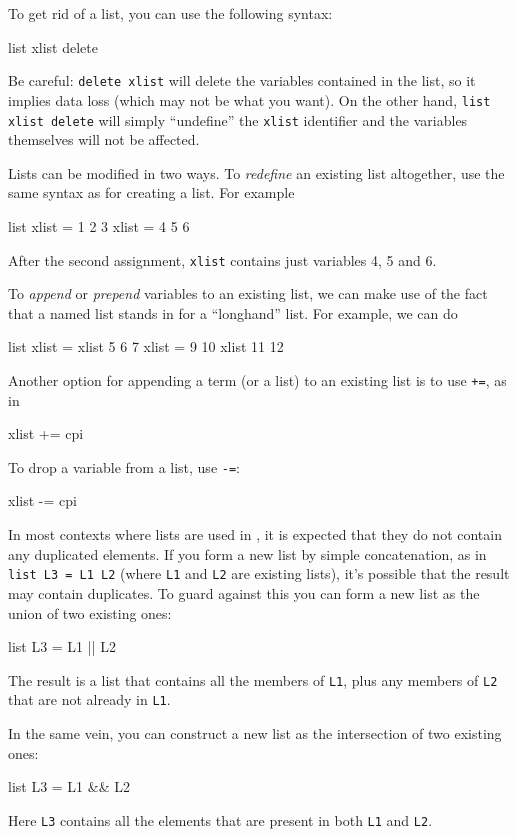 To get rid of a list, you can use the following syntax:
\begin{code}
  list xlist delete
\end{code}
Be careful: \texttt{delete xlist} will delete the variables contained
in the list, so it implies data loss (which may not be what you want).
On the other hand, \texttt{list xlist delete} will simply ``undefine''
the \texttt{xlist} identifier and the variables themselves will not be
affected.

Lists can be modified in two ways.  To \textit{redefine} an existing
list altogether, use the same syntax as for creating a list.  For
example
%
\begin{code}
list xlist = 1 2 3
xlist = 4 5 6
\end{code}

After the second assignment, \texttt{xlist} contains just variables 4,
5 and 6.

To \textit{append} or \textit{prepend} variables to an existing list,
we can make use of the fact that a named list stands in for a
``longhand'' list.  For example, we can do
%
\begin{code}
list xlist = xlist 5 6 7
xlist = 9 10 xlist 11 12
\end{code}
%
Another option for appending a term (or a list) to an existing list is
to use \texttt{+=}, as in
%
\begin{code}
xlist += cpi
\end{code}
%
To drop a variable from a list, use \texttt{-=}:
%
\begin{code}
xlist -= cpi
\end{code}
%

In most contexts where lists are used in , it is expected
that they do not contain any duplicated elements.  If you form a new
list by simple concatenation, as in \texttt{list L3 = L1 L2}
(where \texttt{L1} and \texttt{L2} are existing lists), it's possible
that the result may contain duplicates.  To guard against this you can
form a new list as the union of two existing ones:
%
\begin{code}
list L3 = L1 || L2
\end{code}
%
The result is a list that contains all the members of \texttt{L1},
plus any members of \texttt{L2} that are not already in \texttt{L1}.

In the same vein, you can construct a new list as the intersection of
two existing ones:
%
\begin{code}
list L3 = L1 && L2
\end{code}
%
Here \texttt{L3} contains all the elements that are present in both
\texttt{L1} and \texttt{L2}.


